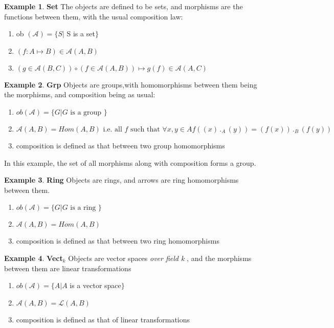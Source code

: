 \documentclass{article}
\theoremstyle{definition}
\newtheorem{example}{Example}[section]
\theoremstyle{definition}
\begin{document}
\begin{example}{\textbf{Set}} %
	The objects are defined to be sets, and morphisms are the functions between them, with the usual composition law:
	\begin{enumerate}[label=\roman*] %
	\item ob $ (\mathcal{A}) = \{ S | $  S is a set$ \} $
	\item $  (f:A \mapsto B )\in \mathcal{A}(A,B)$
	\item  $ (g \in \mathcal{A}(B,C))  \circ (f \in \mathcal{A}(A,B)) \mapsto  g(f) \in \mathcal{A}(A,C) $
	\end{enumerate}
\end{example}
\begin{example}{\textbf{Grp}} %
Objects are groups,with homomorphisms between them being the morphisms, and composition being as usual:
	\begin{enumerate}[label=\roman*]
	\item $  ob(\mathcal{A} ) = \{G| G \text{ is a group } \}  $
	\item $ \mathcal{A} (A,B)= Hom(A,B) \text{ i.e. all } f \text{ such that } \forall x,y \in A f((x) \, ._A \, (y))=(f(x)) \,._B\,(f(y))      $
	\item  composition is defined as that between two group homomorphisms
\end{enumerate}
In this example, the set of all morphisms along with composition forms a group.
\end{example}
\begin{example}{\textbf{Ring}} %
Objects are rings, and arrows are ring homomorphisms between them.
\begin{enumerate}[label=\roman*]
	\item $  ob(\mathcal{A} ) = \{G| G \text{ is a ring } \}  $
	\item $ \mathcal{A} (A,B) = Hom(A,B) $
	\item  composition is defined as that between two ring homomorphisms
\end{enumerate}
\end{example}
\begin{example}{\textbf{Vect$ _k$ }} %
Objects are vector spaces \textit{over field k} , and the morphisms between them are linear transformations
	\begin{enumerate}[label=\roman*]
	\item $ ob(\mathcal{A} ) = \{A | A $ is  a vector space$   \}$
	\item $ \mathcal{A} (A,B) = \mathcal{L} (A,B) $
	\item  composition is defined as that of linear transformations
\end{enumerate}
\end{example}
\end{document}
